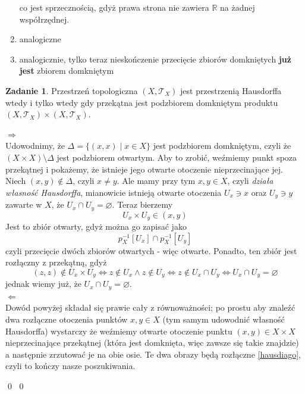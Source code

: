 \documentclass{article}
\theoremstyle{definition}%
\theoremstyle{theorem}
\newtheorem{zad}{Zadanie}
\renewenvironment{proof}{{\bfseries Rozwiązanie \\}}{\qed}
\newcommand{\R}{\mathbb{R}} %
\newcommand{\sT}{\mathcal{T}} %
\begin{document}
\begin{proof}
\begin{enumerate}
			co jest sprzecznością, gdyż prawa strona nie zawiera $\R$ na żadnej współrzędnej.
			\item
			analogiczne
			\item
			analogicznie, tylko teraz nieskończenie przecięcie zbiorów domkniętych \textbf{już jest} zbiorem domkniętym
		\end{enumerate}
		\begin{zad}
			Przestrzeń topologiczna $(X, \sT_X )$ jest przestrzenią Hausdorffa wtedy i tylko wtedy gdy przekątna
			jest podzbiorem domkniętym produktu $(X, \sT_X ) \times (X, \sT_X )$.
		\end{zad}
		\begin{proof}
			$\Rightarrow$ \\
			Udowodnimy, że $\Delta = \{(x,x) \mid x\in X \}$ jest podzbiorem domkniętym, czyli że $(X\times X) \setminus \Delta$ jest podzbiorem otwartym. Aby to zrobić, weźmiemy punkt spoza przekątnej i pokażemy, że istnieje jego otwarte otoczenie nieprzecinające jej.\\
			Niech $(x,y) \notin \Delta$, czyli $x\neq y$. Ale mamy przy tym $x,y\in X$, czyli \emph{działa własność Hausdorffa}, mianowicie istnieją otwarte otoczenia $U_x \ni x$ oraz $U_y \ni y$ zawarte w $X$, że $U_x \cap U_y = \varnothing$. Teraz bierzemy
			\[
			U_x \times U_y \in (x,y)
			\]
			Jest to zbiór otwarty, gdyż można go zapisać jako
			\[
			p_X^{-1}[U_x] \cap p_X^{-1}[U_y]
			\]
			czyli przecięcie dwóch zbiorów otwartych - więc otwarte. Ponadto, ten zbiór jest rozłączny z przekątną, gdyż
			\begin{equation}\label{hausdiago}
			(z,z)\notin U_x \times U_y \Leftrightarrow z \notin U_x \wedge z \notin U_y \Leftrightarrow z \notin U_x \cap U_y \Leftrightarrow U_x \cap U_y = \varnothing
			\end{equation}
			jednak wiemy już, że $U_x \cap U_y = \varnothing$.\\
			$\Leftarrow$ \\
			Dowód powyżej składał się prawie cały z równoważności; po prostu aby znaleźć dwa rozłączne otoczenia punktów $x,y\in X$ (tym samym udowodnić własność Hausdorffa) wystarczy że weźmiemy otwarte otoczenie punktu $(x,y)\in X\times X$ nieprzecinające przekątnej (która jest domknięta, więc zawsze się takie znajdzie) a następnie zrzutować je na obie osie. Te dwa obrazy będą rozłączne \eqref{hausdiago}, czyli to kończy nasze poszukiwania.
			
		\end{proof}
	\end{proof}
\end{document}

